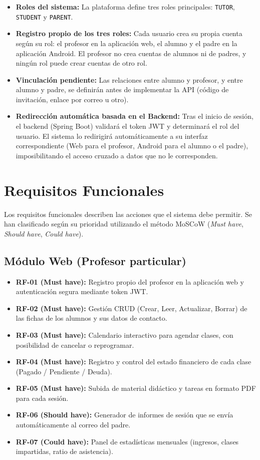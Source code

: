 \documentclass[12pt,a4paper]{report}
\begin{document}
\begin{itemize}
    \item \textbf{Roles del sistema:} La plataforma define tres roles principales: \texttt{TUTOR}, \texttt{STUDENT} y \texttt{PARENT}.
    \item \textbf{Registro propio de los tres roles:} Cada usuario crea su propia cuenta según su rol: el profesor en la aplicación web, el alumno y el padre en la aplicación Android. El profesor no crea cuentas de alumnos ni de padres, y ningún rol puede crear cuentas de otro rol.
    \item \textbf{Vinculación pendiente:} Las relaciones entre alumno y profesor, y entre alumno y padre, se definirán antes de implementar la API (código de invitación, enlace por correo u otro).
    \item \textbf{Redirección automática basada en el Backend:} Tras el inicio de sesión, el backend (Spring Boot) validará el token JWT y determinará el rol del usuario. El sistema lo redirigirá automáticamente a su interfaz correspondiente (Web para el profesor, Android para el alumno o el padre), imposibilitando el acceso cruzado a datos que no le corresponden.
\end{itemize}

\section{Requisitos Funcionales}

Los requisitos funcionales describen las acciones que el sistema debe permitir. Se han clasificado según su prioridad utilizando el método MoSCoW (\textit{Must have}, \textit{Should have}, \textit{Could have}).

\subsection{Módulo Web (Profesor particular)}
\begin{itemize}
    \item \textbf{RF-01 (Must have):} Registro propio del profesor en la aplicación web y autenticación segura mediante token JWT.
    \item \textbf{RF-02 (Must have):} Gestión CRUD (Crear, Leer, Actualizar, Borrar) de las fichas de los alumnos y sus datos de contacto.
    \item \textbf{RF-03 (Must have):} Calendario interactivo para agendar clases, con posibilidad de cancelar o reprogramar.
    \item \textbf{RF-04 (Must have):} Registro y control del estado financiero de cada clase (Pagado / Pendiente / Deuda).
    \item \textbf{RF-05 (Must have):} Subida de material didáctico y tareas en formato PDF para cada sesión.
    \item \textbf{RF-06 (Should have):} Generador de informes de sesión que se envía automáticamente al correo del padre.
    \item \textbf{RF-07 (Could have):} Panel de estadísticas mensuales (ingresos, clases impartidas, ratio de asistencia).
\end{itemize}
\end{document}
